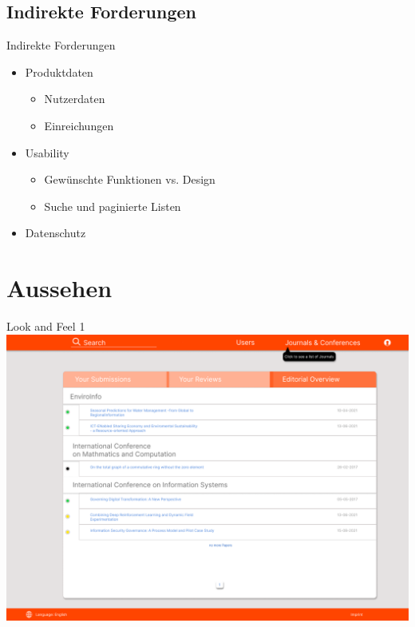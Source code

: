 \documentclass{beamer}
\begin{document}
\subsection{Indirekte Forderungen}
\begin{frame}{Indirekte Forderungen}
		\begin{itemize}
		\item Produktdaten
		\begin{itemize}
			\item Nutzerdaten
			\item Einreichungen
		\end{itemize}
		\pause
		\item Usability
		\begin{itemize}
			\item Gewünschte Funktionen vs. Design
			\item Suche und paginierte Listen
		\end{itemize}
		\pause
		\item Datenschutz
	\end{itemize}
\end{frame}

\section{Aussehen}
\begin{frame}{Look and Feel 1}
	\centering
	\includegraphics[height=0.75\textheight]{../../docs/Pflichtenheft/graphics/Homepage-png}
\end{frame}
\end{document}
